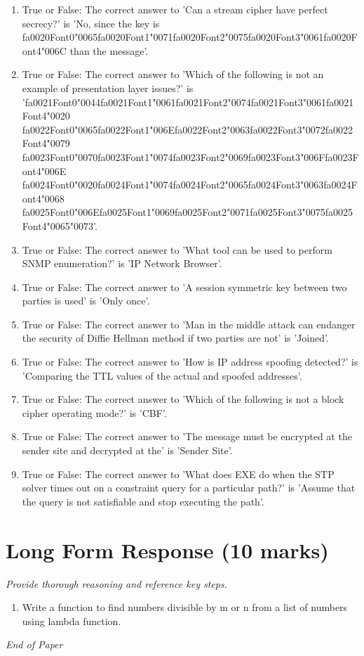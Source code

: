 \documentclass[12pt]{article}
\begin{document}
\begin{enumerate}[label=\arabic*.]
\item True or False: The correct answer to 'Can a stream cipher have perfect secrecy?' is 'No, since the key is {\csname fa0020Font0\endcsname\char"0065}{\csname fa0020Font1\endcsname\char"0071}{\csname fa0020Font2\endcsname\char"0075}{\csname fa0020Font3\endcsname\char"0061}{\csname fa0020Font4\endcsname\char"006C} than the message'.
\item True or False: The correct answer to 'Which of the following is not an example of presentation layer issues?' is '{\csname fa0021Font0\endcsname\char"0044}{\csname fa0021Font1\endcsname\char"0061}{\csname fa0021Font2\endcsname\char"0074}{\csname fa0021Font3\endcsname\char"0061}{\csname fa0021Font4\endcsname\char"0020} {\csname fa0022Font0\endcsname\char"0065}{\csname fa0022Font1\endcsname\char"006E}{\csname fa0022Font2\endcsname\char"0063}{\csname fa0022Font3\endcsname\char"0072}{\csname fa0022Font4\endcsname\char"0079} {\csname fa0023Font0\endcsname\char"0070}{\csname fa0023Font1\endcsname\char"0074}{\csname fa0023Font2\endcsname\char"0069}{\csname fa0023Font3\endcsname\char"006F}{\csname fa0023Font4\endcsname\char"006E} {\csname fa0024Font0\endcsname\char"0020}{\csname fa0024Font1\endcsname\char"0074}{\csname fa0024Font2\endcsname\char"0065}{\csname fa0024Font3\endcsname\char"0063}{\csname fa0024Font4\endcsname\char"0068} {\csname fa0025Font0\endcsname\char"006E}{\csname fa0025Font1\endcsname\char"0069}{\csname fa0025Font2\endcsname\char"0071}{\csname fa0025Font3\endcsname\char"0075}{\csname fa0025Font4\endcsname\char"0065}{\char"0073}'.
\item True or False: The correct answer to 'What tool can be used to perform SNMP enumeration?' is 'IP Network Browser'.
\item True or False: The correct answer to 'A session symmetric key between two parties is used' is 'Only once'.
\item True or False: The correct answer to 'Man in the middle attack can endanger the security of Diffie Hellman method if two parties are not' is 'Joined'.
\item True or False: The correct answer to 'How is IP address spoofing detected?' is 'Comparing the TTL values of the actual and spoofed addresses'.
\item True or False: The correct answer to 'Which of the following is not a block cipher operating mode?' is 'CBF'.
\item True or False: The correct answer to 'The message must be encrypted at the sender site and decrypted at the' is 'Sender Site'.
\item True or False: The correct answer to 'What does EXE do when the STP solver times out on a constraint query for a particular path?' is 'Assume that the query is not satisfiable and stop executing the path'.
\end{enumerate}

\section*{Long Form Response (10 marks)}
\textit{Provide thorough reasoning and reference key steps.}
\begin{enumerate}[label=\arabic*.]
\item Write a function to find numbers divisible by m or n from a list of numbers using lambda
function.
\end{enumerate}

\vfill
\noindent\textit{End of Paper}
\end{document}
